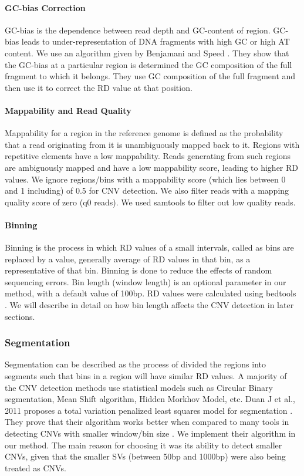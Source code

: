 \documentclass[twocolumn,oneside,conference]
{IEEEtran}
\begin{document}
\paragraph*{GC-bias Correction}
GC-bias is the dependence between read depth and GC-content of region. GC-bias leads to under-representation of DNA fragments with high GC or high AT content. We use an algorithm given by Benjamani and Speed \cite{17}. They show that the GC-bias at a particular region is determined the GC composition of the full fragment to which it belongs. They use GC composition of the full fragment and then use it to correct the RD value at that position.

\paragraph*{Mappability and Read Quality}
Mappability for a region in the reference genome is defined
as the probability that a read originating from it is unambiguously mapped back to it. Regions with repetitive elements have a low mappability. Reads generating from such regions are ambiguously mapped and have a low mappability score, leading to higher RD values. We ignore regions/bins with a mappability score (which lies between 0 and 1 including) of 0.5 for CNV detection. We also filter reads with a mapping quality score of zero (q0 reads). We used samtools \cite{18} to filter out low quality reads.

\paragraph*{Binning}
Binning is the process in which RD values of a small intervals, called as bins are replaced by a value, generally average of RD values in that bin, as a representative of that bin. Binning is done to reduce the effects of random sequencing errors. Bin length (window length) is an optional parameter in our method, with a default value of 100bp. RD values were calculated using bedtools \cite{19}. We will describe in detail on how bin length affects the CNV detection in later sections.         


\subsubsection{Segmentation}
Segmentation can be described as the process of divided the regions into segments such that bins in a region will have similar RD values. A majority of the CNV detection methods use statistical models such as Circular Binary segmentation, Mean Shift algorithm, Hidden Morkhov Model, etc. Duan J et al., 2011 proposes a total variation penalized least squares model for segmentation \cite{20}. They prove that their algorithm works better when compared to many tools in detecting CNVs with smaller window/bin size \cite{12}. We implement their algorithm in our method. The main reason for choosing it was its ability to detect smaller CNVs, given that the smaller SVs (between 50bp and 1000bp) were also being treated as CNVs.  
\end{document}

